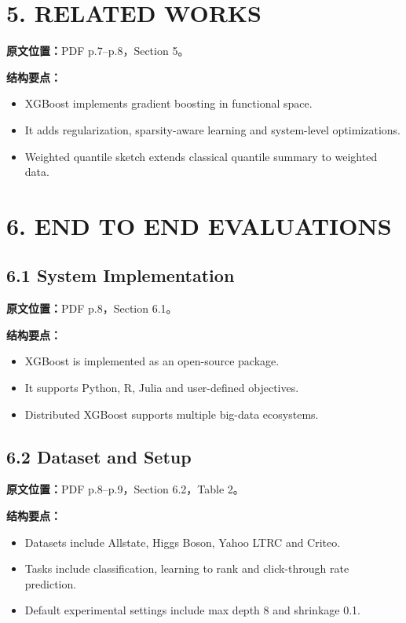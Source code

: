 \section{5. RELATED WORKS}

\textbf{原文位置：}PDF p.7--p.8，Section 5。

\textbf{结构要点：}
\begin{itemize}
  \item XGBoost implements gradient boosting in functional space.
  \item It adds regularization, sparsity-aware learning and system-level optimizations.
  \item Weighted quantile sketch extends classical quantile summary to weighted data.
\end{itemize}

\section{6. END TO END EVALUATIONS}

\subsection{6.1 System Implementation}

\textbf{原文位置：}PDF p.8，Section 6.1。

\textbf{结构要点：}
\begin{itemize}
  \item XGBoost is implemented as an open-source package.
  \item It supports Python, R, Julia and user-defined objectives.
  \item Distributed XGBoost supports multiple big-data ecosystems.
\end{itemize}

\subsection{6.2 Dataset and Setup}

\textbf{原文位置：}PDF p.8--p.9，Section 6.2，Table 2。

\textbf{结构要点：}
\begin{itemize}
  \item Datasets include Allstate, Higgs Boson, Yahoo LTRC and Criteo.
  \item Tasks include classification, learning to rank and click-through rate prediction.
  \item Default experimental settings include max depth 8 and shrinkage 0.1.
\end{itemize}

